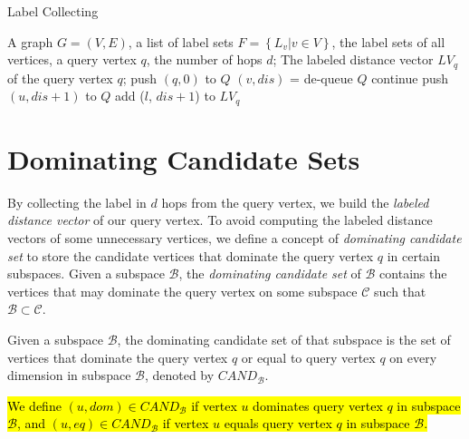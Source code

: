 \begin{algorithm}[h]
  \caption{Label Collecting}
  \label{algo:graph_collect}
  \begin{algorithmic}[1]
  \show\LOOP
    \REQUIRE A graph $G=(V,E)$, a list of label sets $F=\left\{L_v | v \in V\right\}$, the label sets of all vertices, a query vertex $q$, the number of hops $d$;
    \ENSURE The labeled distance vector $LV_q$ of the query vertex $q$;
    \STATE push $\left(q, 0\right)$ to $Q$
        \STATE $\left( v, dis\right)$ = de-queue $Q$
            \STATE continue
        \ENDIF
            \STATE push $\left(u, dis+1\right)$ to $Q$
                    \STATE add ($l$, $dis+1$) to $LV_q$
                \ENDIF
            \ENDFOR
        \ENDFOR
    \ENDWHILE
  \end{algorithmic}
\end{algorithm}

\section{Dominating Candidate Sets}
\label{sec:dom-cand}

By collecting the label in $d$ hops from the query vertex, we build the \emph{labeled distance vector} of our query vertex. To avoid computing the labeled distance vectors of some unnecessary vertices, we define a concept of \emph{dominating candidate set} to store the candidate vertices that dominate the query vertex $q$ in certain subspaces. Given a subspace $\mathcal{B}$, the \emph{dominating candidate set} of $\mathcal{B}$ contains the vertices that may dominate the query vertex on some subspace $\mathcal{C}$ such that $\mathcal{B} \subset \mathcal{C}$.

\begin{definition}
Given a subspace $\mathcal{B}$, the dominating candidate set of that subspace is the set of vertices that dominate the query vertex $q$ or equal to query vertex $q$ on every dimension in subspace $\mathcal{B}$, denoted by $\mathit{CAND}_\mathcal{B}$.

\hl{We define $(u, dom) \in \mathit{CAND}_\mathcal{B}$ if vertex $u$ dominates query vertex $q$ in subspace $\mathcal{B}$, and $(u, eq) \in \mathit{CAND}_\mathcal{B}$ if vertex $u$ equals query vertex $q$ in subspace $\mathcal{B}$.}
\end{definition}

